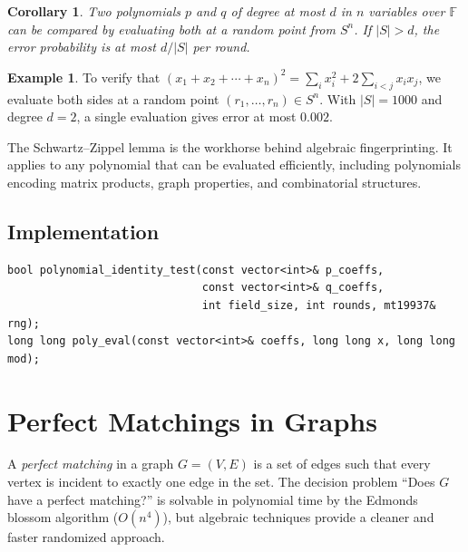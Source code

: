 \documentclass[twoside,12pt]{book}
\theoremstyle{plain}
\newtheorem{corollary}[theorem]{Corollary}
\theoremstyle{definition}
\newtheorem{example}[theorem]{Example}
\theoremstyle{remark}
\newenvironment{cpplisting}{\begin{center}\small}{\end{center}}
\begin{document}
\begin{corollary}
\label{cor:pit}
Two polynomials $p$ and $q$ of degree at most $d$ in $n$ variables over $\mathbb{F}$ can be compared by evaluating both at a random point from $S^n$. If $|S| > d$, the error probability is at most $d/|S|$ per round.
\end{corollary}

\begin{example}
To verify that $(x_1 + x_2 + \cdots + x_n)^2 = \sum_{i} x_i^2 + 2\sum_{i < j} x_i x_j$, we evaluate both sides at a random point $(r_1, \ldots, r_n) \in S^n$. With $|S| = 1000$ and degree $d = 2$, a single evaluation gives error at most $0.002$.
\end{example}

The Schwartz--Zippel lemma is the workhorse behind algebraic fingerprinting. It applies to any polynomial that can be evaluated efficiently, including polynomials encoding matrix products, graph properties, and combinatorial structures.

\subsection*{Implementation}

\begin{cpplisting}
\begin{lstlisting}[title={Polynomial identity testing --- \texttt{src/chapter8/polynomial.h}}]
bool polynomial_identity_test(const vector<int>& p_coeffs,
                              const vector<int>& q_coeffs,
                              int field_size, int rounds, mt19937& rng);
long long poly_eval(const vector<int>& coeffs, long long x, long long mod);
\end{lstlisting}
\end{cpplisting}


\section{Perfect Matchings in Graphs}
\label{sec:perfect-matchings}

A \emph{perfect matching} in a graph $G = (V, E)$ is a set of edges such that every vertex is incident to exactly one edge in the set. The decision problem ``Does $G$ have a perfect matching?'' is solvable in polynomial time by the Edmonds blossom algorithm ($O(n^4)$), but algebraic techniques provide a cleaner and faster randomized approach.
\end{document}
